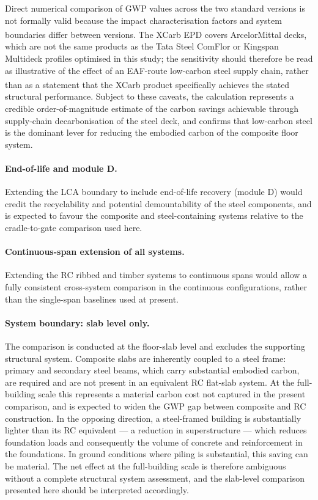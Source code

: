Direct numerical comparison of GWP values across the two standard versions is not formally valid because the impact characterisation factors and system boundaries differ between versions. The XCarb\textsuperscript{\textregistered} EPD covers ArcelorMittal decks, which are not the same products as the Tata Steel ComFlor or Kingspan Multideck profiles optimised in this study; the sensitivity should therefore be read as illustrative of the effect of an EAF-route low-carbon steel supply chain, rather than as a statement that the XCarb\textsuperscript{\textregistered} product specifically achieves the stated structural performance. Subject to these caveats, the calculation represents a credible order-of-magnitude estimate of the carbon savings achievable through supply-chain decarbonisation of the steel deck, and confirms that low-carbon steel is the dominant lever for reducing the embodied carbon of the composite floor system.

\paragraph{End-of-life and module D.} Extending the LCA boundary to include end-of-life recovery (module D) would credit the recyclability and potential demountability of the steel components, and is expected to favour the composite and steel-containing systems relative to the cradle-to-gate comparison used here.

\paragraph{Continuous-span extension of all systems.} Extending the RC ribbed and timber systems to continuous spans would allow a fully consistent cross-system comparison in the continuous configurations, rather than the single-span baselines used at present.

\paragraph{System boundary: slab level only.} The comparison is conducted at the floor-slab level and excludes the supporting structural system. Composite slabs are inherently coupled to a steel frame:  primary and secondary steel beams, which carry substantial embodied carbon, are required and are not present in an equivalent RC flat-slab system. At the full-building scale this represents a material carbon cost not captured in the present comparison, and is expected to widen the GWP gap between composite and RC construction. In the opposing direction, a steel-framed building is substantially lighter than its RC equivalent --- a reduction in superstructure --- which reduces foundation loads and consequently the volume of concrete and reinforcement in the foundations. In ground conditions where piling is substantial, this saving can be material. The net effect at the full-building scale is therefore ambiguous without a complete structural system assessment, and the slab-level comparison presented here should be interpreted accordingly.

